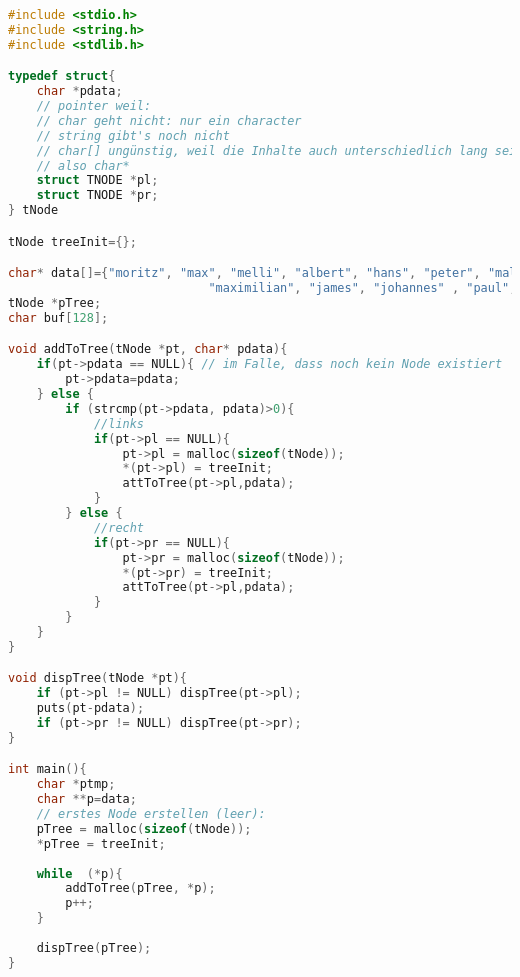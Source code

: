 \documentclass{scrreprt}
\begin{document}
\begin{lstlisting}[language=C]
#include <stdio.h>
#include <string.h>
#include <stdlib.h>

typedef struct{
	char *pdata;
	// pointer weil: 
	// char geht nicht: nur ein character
	// string gibt's noch nicht
	// char[] ungünstig, weil die Inhalte auch unterschiedlich lang seien könnten.
	// also char*
	struct TNODE *pl;
	struct TNODE *pr;
} tNode

tNode treeInit={};

char* data[]={"moritz", "max", "melli", "albert", "hans", "peter", "malte",
							"maximilian", "james", "johannes" , "paul",  NULL);
tNode *pTree;
char buf[128];

void addToTree(tNode *pt, char* pdata){
	if(pt->pdata == NULL){ // im Falle, dass noch kein Node existiert
		pt->pdata=pdata;
	} else {
		if (strcmp(pt->pdata, pdata)>0){
			//links
			if(pt->pl == NULL){
				pt->pl = malloc(sizeof(tNode));
				*(pt->pl) = treeInit;
				attToTree(pt->pl,pdata);
			}
		} else {
			//recht
			if(pt->pr == NULL){
				pt->pr = malloc(sizeof(tNode));
				*(pt->pr) = treeInit;
				attToTree(pt->pl,pdata);
			}
		}
	}
}

void dispTree(tNode *pt){
	if (pt->pl != NULL) dispTree(pt->pl);
	puts(pt-pdata);
	if (pt->pr != NULL) dispTree(pt->pr);
}

int main(){
	char *ptmp;
	char **p=data;
	// erstes Node erstellen (leer):
	pTree = malloc(sizeof(tNode));
	*pTree = treeInit;
	
	while  (*p){
		addToTree(pTree, *p); 
		p++;
	}
	
	dispTree(pTree);
}
\end{lstlisting}
\end{document}
